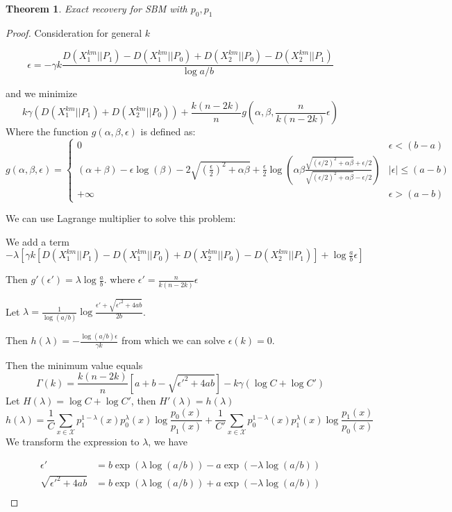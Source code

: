 \documentclass{article}
\newtheorem{theorem}{Theorem}
\begin{document}
\begin{theorem}
	Exact recovery for SBM with $p_0, p_1$
\end{theorem}
\begin{proof}
	Consideration for general $k$
	
	$$
	\epsilon = -\gamma k\frac{D(X_1^{km} || P_1) - D(X_1^{km} || P_0) + D(X_2^{km} || P_0) - D(X_2^{km} || P_1)}{\log a /b}
	$$
	
	and we minimize
	$$
	k\gamma (D(X_1^{km}||P_1) + D(X_2^{km}||P_0)) + \frac{k(n-2k)}{n} g(\alpha, \beta, \frac{n}{k(n-2k)}\epsilon)
	$$
	Where the function $g(\alpha, \beta, \epsilon)$ is defined as:
	$$
	g(\alpha, \beta, \epsilon) = \begin{cases}
	0 & \epsilon < (b-a) \\
	(\alpha+\beta)-\epsilon \log(\beta) - 2\sqrt{\left( \frac{\epsilon}{2}\right)^2 +\alpha \beta} +\frac{\epsilon}{2} \log \left( \alpha \beta \frac{\sqrt{(\epsilon/2)^2 +\alpha \beta} +\epsilon/2}{\sqrt{(\epsilon/2)^2 +\alpha \beta} -\epsilon/2} \right)& |\epsilon| \leq(a-b) \\
	+\infty & \epsilon > (a-b)
	\end{cases}
	$$
	
	We can use Lagrange multiplier to solve this problem:
	
	We add a term $-\lambda[ \gamma k[D(X_1^{km} || P_1) - D(X_1^{km} || P_0) + D(X_2^{km} || P_0) - D(X_2^{km} || P_1)]+ \log\frac{a}{b}\epsilon]$
	
	Then $g'(\epsilon') = \lambda \log\frac{a}{b}$. where $\epsilon' = \frac{n}{k(n-2k)}\epsilon$
	
	Let $\lambda = \frac{1}{\log(a/b)}\log\frac{\epsilon'+\sqrt{\epsilon'^2+4ab}}{2b}$.
	
	Then $h(\lambda) = -\frac{\log(a/b)\epsilon}{\gamma k}$ from which we can solve $\epsilon(k)=0$.
	
	Then the minimum value equals
	$$
	\Gamma(k) = \frac{k(n-2k)}{n}[a+b-\sqrt{\epsilon'^2 + 4ab}] - k\gamma(\log C + \log C')
	$$
	Let $H(\lambda) = \log C + \log C'$, then $H'(\lambda) = h(\lambda)$
	$$
	h(\lambda)=\frac{1}{C}\sum_{x\in\mathcal{X}} p^{1-\lambda}_1(x)p^{\lambda}_0(x)\log\frac{p_0(x)}{p_1(x)}+\frac{1}{C'}\sum_{x\in\mathcal{X}} p^{1-\lambda}_0(x)p^{\lambda}_1(x)\log\frac{p_1(x)}{p_0(x)}
	$$
	We transform the expression to $\lambda$, we have
	
	\begin{align}
	\epsilon' &= b \exp(\lambda \log(a/b)) - a\exp(-\lambda  \log(a/b)) \\
	\sqrt{\epsilon'^2 + 4ab}  &= b \exp(\lambda  \log(a/b)) + a\exp(-\lambda  \log(a/b)) \\
	\end{align}
	

\end{proof}
\end{document}
